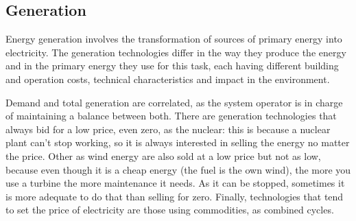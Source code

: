 \subsection{Generation}
Energy generation involves the transformation of sources of primary energy into electricity.
The generation technologies differ in the way they produce the energy and in the primary energy they use for this task, each having different building and operation costs, technical characteristics and impact in the environment. \cite{subasta-electrica-totalenergies}

Demand and total generation are correlated, as the system operator is in charge of maintaining a balance between both.
There are generation technologies that always bid for a low price, even zero, as the nuclear: this is because a nuclear plant can't stop working, so it is always interested in selling the energy no matter the price.
Other as wind energy are also sold at a low price but not as low, because even though it is a cheap energy (the fuel is the own wind), the more you use a turbine the more maintenance it needs.
As it can be stopped, sometimes it is more adequate to do that than selling for zero.
Finally, technologies that tend to set the price of electricity are those using commodities, as combined cycles.

